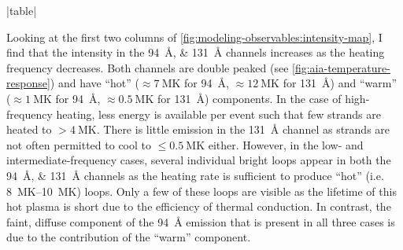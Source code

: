 |table|

Looking at the first two columns of \autoref{fig:modeling-observables:intensity-map}, I find that the intensity in the \SIlist{94;131}{\angstrom} channels increases as the heating frequency decreases. Both channels are double peaked (see \autoref{fig:aia-temperature-response}) and have ``hot'' ($\approx\SI{7}{\mega\kelvin}$ for \SI{94}{\angstrom}, $\approx\SI{12}{\mega\kelvin}$ for \SI{131}{\angstrom}) and ``warm'' ($\approx\SI{1}{\mega\kelvin}$ for \SI{94}{\angstrom}, $\approx\SI{0.5}{\mega\kelvin}$ for \SI{131}{\angstrom}) components. In the case of high-frequency heating, less energy is available per event such that few strands are heated to $>\SI{4}{\mega\kelvin}$. There is little emission in the \SI{131}{\angstrom} channel as strands are not often permitted to cool to $\leq\SI{0.5}{\mega\kelvin}$ either. However, in the low- and intermediate-frequency cases, several individual bright loops appear in both the \SIlist{94;131}{\angstrom} channels as the heating rate is sufficient to produce ``hot'' (i.e. \SIrange{8}{10}{\mega\kelvin}) loops. Only a few of these loops are visible as the lifetime of this hot plasma is short due to the efficiency of thermal conduction. In contrast, the faint, diffuse component of the \SI{94}{\angstrom} emission that is present in all three cases is due to the contribution of the ``warm'' component. 

